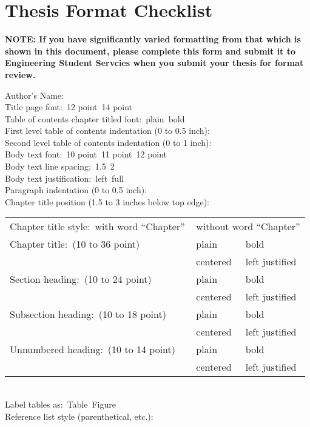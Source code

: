\chapter{Thesis Format Checklist}

\newcommand{\smallblank}{\underline{\hspace{0.25in}}\,}
\newcommand{\largeblank}{\underline{\hspace{0.75in}}\,}

{\footnotesize \textbf{NOTE: If you have significantly varied formatting from that
which is shown in this document, please complete this form and submit it to
Engineering Student Servcies when you submit your thesis for format review.}}

Author's Name:  \underline{\hspace{4.0in}} \\
Title page font:  \smallblank 12 point \indent \smallblank 14 point \\
Table of contents chapter titled font: \smallblank plain \indent \smallblank bold \\
First level table of contents indentation (0 to 0.5 inch): \largeblank \\  
Second level table of contents indentation (0 to 1 inch): \largeblank \\
Body text font: \smallblank 10 point \quad \smallblank 11 point \quad \smallblank 12 point \\
Body text line spacing: \smallblank 1.5 \quad \smallblank 2 \indent \\
Body text justification: \smallblank left \quad \smallblank full \\
Paragraph indentation (0 to 0.5 inch):  \largeblank \\
Chapter title position (1.5 to 3 inches below top edge):  \largeblank \\
\begin{tabular}{@{}lll}
Chapter title style: \smallblank with word ``Chapter'' & \multicolumn{2}{l}{\smallblank without word ``Chapter''} \\
Chapter title:  \smallblank (10 to 36 point) & \smallblank plain & \smallblank bold \\
& \smallblank centered & \smallblank left justified \\
Section heading: \smallblank (10 to 24 point) & \smallblank plain & \smallblank bold \\
& \smallblank centered & \smallblank left justified \\
Subsection heading:  \smallblank (10 to 18 point) & \smallblank plain & \smallblank bold \\
& \smallblank centered & \smallblank left justified \\
Unnumbered heading: \smallblank (10 to 14 point) & \smallblank plain & \smallblank bold \\
& \smallblank centered & \smallblank left justified
\end{tabular} \\
Label tables as: \smallblank Table \quad \smallblank Figure \\
Reference list style (parenthetical, etc.): \underline{\hspace{3.0in}}

